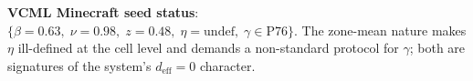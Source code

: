 \documentclass[12pt,a4paper]{article}
\begin{document}
\vspace{1em}
\noindent\textbf{VCML Minecraft seed status}: $\{\beta=0.63,\;\nu=0.98,\;z=0.48,\;\eta=\mathrm{undef},\;\gamma\in\mathrm{P76}\}$.
The zone-mean nature makes $\eta$ ill-defined at the cell level and demands a non-standard
protocol for $\gamma$; both are signatures of the system's $d_\mathrm{eff}=0$ character.
\end{document}
